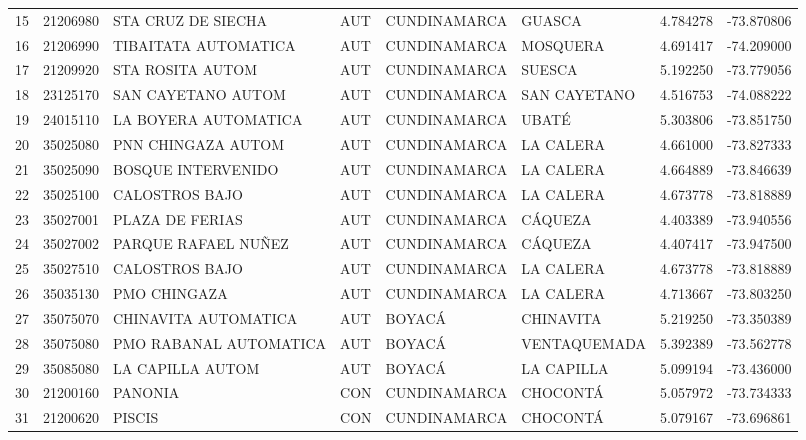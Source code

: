 \documentclass[11pt]{article}
\begin{document}
\begin{table}
\begin{tabular}{lrllllrr}
15  &  21206980 &        STA CRUZ DE SIECHA &  AUT &  CUNDINAMARCA &            GUASCA &  4.784278 & -73.870806 \\
16  &  21206990 &      TIBAITATA AUTOMATICA &  AUT &  CUNDINAMARCA &          MOSQUERA &  4.691417 & -74.209000 \\
17  &  21209920 &          STA ROSITA AUTOM &  AUT &  CUNDINAMARCA &            SUESCA &  5.192250 & -73.779056 \\
18  &  23125170 &        SAN CAYETANO AUTOM &  AUT &  CUNDINAMARCA &      SAN CAYETANO &  4.516753 & -74.088222 \\
19  &  24015110 &      LA BOYERA AUTOMATICA &  AUT &  CUNDINAMARCA &             UBATÉ &  5.303806 & -73.851750 \\
20  &  35025080 &        PNN CHINGAZA AUTOM &  AUT &  CUNDINAMARCA &         LA CALERA &  4.661000 & -73.827333 \\
21  &  35025090 &        BOSQUE INTERVENIDO &  AUT &  CUNDINAMARCA &         LA CALERA &  4.664889 & -73.846639 \\
22  &  35025100 &            CALOSTROS BAJO &  AUT &  CUNDINAMARCA &         LA CALERA &  4.673778 & -73.818889 \\
23  &  35027001 &           PLAZA DE FERIAS &  AUT &  CUNDINAMARCA &           CÁQUEZA &  4.403389 & -73.940556 \\
24  &  35027002 &       PARQUE RAFAEL NUÑEZ &  AUT &  CUNDINAMARCA &           CÁQUEZA &  4.407417 & -73.947500 \\
25  &  35027510 &            CALOSTROS BAJO &  AUT &  CUNDINAMARCA &         LA CALERA &  4.673778 & -73.818889 \\
26  &  35035130 &              PMO CHINGAZA &  AUT &  CUNDINAMARCA &         LA CALERA &  4.713667 & -73.803250 \\
27  &  35075070 &      CHINAVITA AUTOMATICA &  AUT &        BOYACÁ &         CHINAVITA &  5.219250 & -73.350389 \\
28  &  35075080 &    PMO RABANAL AUTOMATICA &  AUT &        BOYACÁ &      VENTAQUEMADA &  5.392389 & -73.562778 \\
29  &  35085080 &          LA CAPILLA AUTOM &  AUT &        BOYACÁ &        LA CAPILLA &  5.099194 & -73.436000 \\
30  &  21200160 &                   PANONIA &  CON &  CUNDINAMARCA &          CHOCONTÁ &  5.057972 & -73.734333 \\
31  &  21200620 &                   PISCIS  &  CON &  CUNDINAMARCA &          CHOCONTÁ &  5.079167 & -73.696861 \\

\end{tabular}
\end{table}
\end{document}
